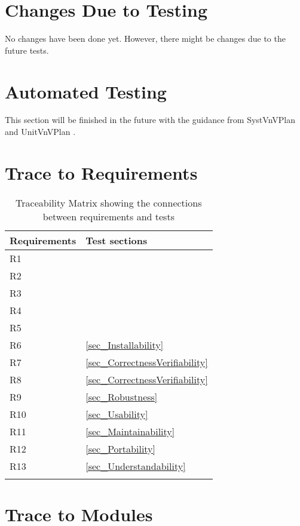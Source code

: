 \documentclass[12pt, titlepage]{article}
\begin{document}
\section{Changes Due to Testing}

No changes have been done yet. However, there might be changes due to the future
tests.

\section{Automated Testing}

This section will be finished in the future with the guidance from SystVnVPlan
\cite{Dong2019SystVnV} and UnitVnVPlan \cite{Dong2019UnitVnV}.
		
\section{Trace to Requirements}

\begin{longtable}{l l}
\toprule
Requirements \cite{Dong2019SRS} & Test sections\\
\midrule
R1 & \\
R2 & \\
R3 & \\
R4 & \\
R5 & \\
R6 & \ref{sec_Installability}\\
R7 & \ref{sec_CorrectnessVerifiability}\\
R8 & \ref{sec_CorrectnessVerifiability}\\
R9 & \ref{sec_Robustness}\\
R10 & \ref{sec_Usability}\\
R11 & \ref{sec_Maintainability}\\
R12 & \ref{sec_Portability}\\
R13 & \ref{sec_Understandability}\\
\bottomrule
\caption{Traceability Matrix showing the connections between requirements and
tests}
\label{Tb_traceRequirements}
\end{longtable}

\section{Trace to Modules}		
\end{document}
